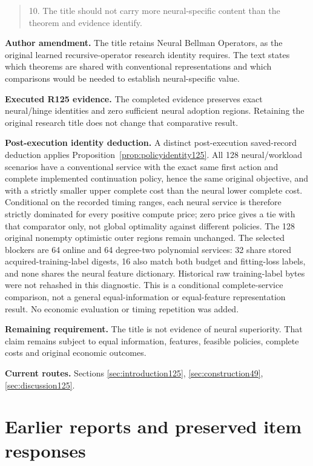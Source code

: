 \begin{quote}\small
10. The title should not carry more neural-specific content than the theorem and evidence identify.
\end{quote}

\noindent\textbf{Author amendment.} The title retains Neural Bellman Operators, as the original learned recursive-operator research identity requires. The text states which theorems are shared with conventional representations and which comparisons would be needed to establish neural-specific value.

\noindent\textbf{Executed R125 evidence.} The completed evidence preserves exact neural/hinge identities and zero sufficient neural adoption regions. Retaining the original research title does not change that comparative result.

\noindent\textbf{Post-execution identity deduction.} A distinct post-execution saved-record deduction applies Proposition~\ref{prop:policyidentity125}. All 128 neural/workload scenarios have a conventional service with the exact same first action and complete implemented continuation policy, hence the same original objective, and with a strictly smaller upper complete cost than the neural lower complete cost. Conditional on the recorded timing ranges, each neural service is therefore strictly dominated for every positive compute price; zero price gives a tie with that comparator only, not global optimality against different policies. The 128 original nonempty optimistic outer regions remain unchanged. The selected blockers are 64 online and 64 degree-two polynomial services: 32 share stored acquired-training-label digests, 16 also match both budget and fitting-loss labels, and none shares the neural feature dictionary. Historical raw training-label bytes were not rehashed in this diagnostic. This is a conditional complete-service comparison, not a general equal-information or equal-feature representation result. No economic evaluation or timing repetition was added.

\noindent\textbf{Remaining requirement.} The title is not evidence of neural superiority. That claim remains subject to equal information, features, feasible policies, complete costs and original economic outcomes.

\noindent\textbf{Current routes.} Sections \ref{sec:introduction125}, \ref{sec:construction49}, \ref{sec:discussion125}.

\section{Earlier reports and preserved item responses}

